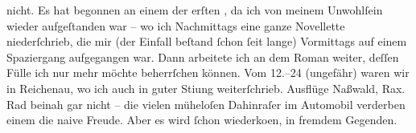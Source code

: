                nicht. Es hat begonnen an einem der erſten \label{K_L01422-1v}\label{K_L01422-1}, da ich von meinem Unwohlſein wieder aufgeſtanden war – wo ich \introOben{}Nachmittags\introOben{} eine ganze Novellette
               niederſchrieb, die mir (der Einfall beſtand{ }ſchon{ }ſeit {\pb}lange) Vormittags auf einem Spaziergang aufgegangen war. Dann
               arbeitete ich an dem Roman
               weiter, deſſen Fülle ich nur mehr möchte beherrſchen können. Vom
                  12.–24 (ungefähr) waren wir in Reichenau, wo ich auch in guter Sti{\geminationm}ung weiterſchrieb. Ausflüge Naßwald, Rax. Rad beinah gar nicht – die vielen müheloſen
               Dahinraſer im Automobil verderben einem die naive Freude. Aber es wird{ }ſchon
                  wiederko{\geminationm}en, in fremdem Gegenden.\pend
           
